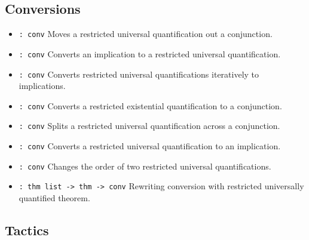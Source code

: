 \documentclass[12pt]{article}
\begin{document}
\subsection*{Conversions}

\begin{itemize}
\item {} \verb|: conv|\newline
Moves a restricted universal quantification out a conjunction.

\item {} \verb|: conv|\newline
Converts an implication to a restricted universal quantification.

\item {} \verb|: conv|\newline
Converts restricted universal quantifications iteratively to implications.

\item {} \verb|: conv|\newline
Converts a restricted existential quantification to a conjunction.

\item {} \verb|: conv|\newline
Splits a restricted universal quantification across a conjunction.

\item {} \verb|: conv|\newline
Converts a restricted universal quantification to an implication.

\item {} \verb|: conv|\newline
Changes the order of two restricted universal quantifications.

\item {} \verb|: thm list -> thm -> conv|\newline
Rewriting conversion with restricted universally quantified theorem.
\end{itemize}

\subsection*{Tactics}
\end{document}
